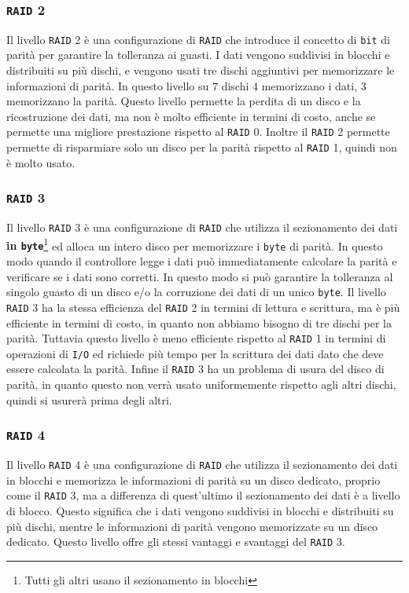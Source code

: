     \subsubsection{\texttt{RAID} 2}
        Il livello \texttt{RAID} 2 è una configurazione di \texttt{RAID} che introduce il concetto di \texttt{bit} di parità per garantire la tolleranza ai guasti. I dati vengono suddivisi in blocchi e distribuiti su più dischi, e vengono usati tre dischi aggiuntivi per memorizzare le informazioni di parità. In questo livello su $7$ dischi $4$ memorizzano i dati, $3$ memorizzano la parità. Questo livello permette la perdita di un disco e la ricostruzione dei dati, ma non è molto efficiente in termini di costo, anche se permette una migliore prestazione rispetto al \texttt{RAID} 0. Inoltre il \texttt{RAID} 2 permette permette di risparmiare solo un disco per la parità rispetto al \texttt{RAID} 1, quindi non è molto usato.
    \subsubsection{\texttt{RAID} 3}
        Il livello \texttt{RAID} 3 è una configurazione di \texttt{RAID} che utilizza il sezionamento dei dati \textbf{in \texttt{byte}}\footnote{Tutti gli altri usano il sezionamento in blocchi} ed alloca un intero disco per memorizzare i \texttt{byte} di parità. In questo modo quando il controllore legge i dati può immediatamente calcolare la parità e verificare se i dati sono corretti. In questo modo si può garantire la tolleranza al singolo guasto di un disco e/o la corruzione dei dati di un unico \texttt{byte}. Il livello \texttt{RAID} 3 ha la stessa efficienza del \texttt{RAID} 2 in termini di lettura e scrittura, ma è più efficiente in termini di costo, in quanto non abbiamo bisogno di tre dischi per la parità. Tuttavia questo livello è meno efficiente rispetto al \texttt{RAID} 1 in termini di operazioni di \texttt{I/O} ed richiede più tempo per la scrittura dei dati dato che deve essere calcolata la parità. Infine il \texttt{RAID} 3 ha un problema di usura del disco di parità, in quanto questo non verrà usato uniformemente rispetto agli altri dischi, quindi si usurerà prima degli altri. 
    
    \subsubsection{\texttt{RAID} 4}
        Il livello \texttt{RAID} 4 è una configurazione di \texttt{RAID} che utilizza il sezionamento dei dati in blocchi e memorizza le informazioni di parità su un disco dedicato, proprio come il \texttt{RAID} 3, ma a differenza di quest'ultimo il sezionamento dei dati è a livello di blocco. Questo significa che i dati vengono suddivisi in blocchi e distribuiti su più dischi, mentre le informazioni di parità vengono memorizzate su un disco dedicato. Questo livello offre gli stessi vantaggi e svantaggi del \texttt{RAID} 3.
